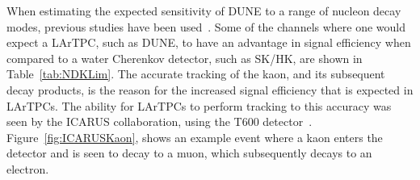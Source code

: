 When estimating the expected sensitivity of DUNE to a range of nucleon decay modes, previous studies have been used~\citep{Bueno, Klinger:2015kva}. Some of the channels where one would expect a LArTPC, such as DUNE, to have an advantage in signal efficiency when compared to a water Cherenkov detector, such as SK/HK, are shown in Table~\ref{tab:NDKLim}. The accurate tracking of the kaon, and its subsequent decay products, is the reason for the increased signal efficiency that is expected in LArTPCs. The ability for LArTPCs to perform tracking to this accuracy was seen by the ICARUS collaboration, using the T600 detector~\citep{PMTrack}. Figure~\ref{fig:ICARUSKaon}, shows an example event where a kaon enters the detector and is seen to decay to a muon, which subsequently decays to an electron. \\

